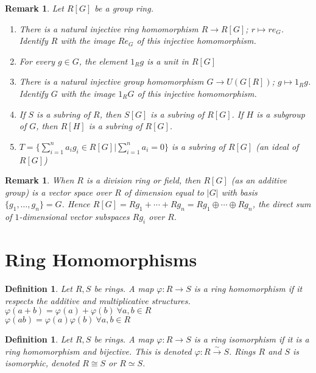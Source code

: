 \documentclass[a4paper,sfsidenotes,openany]{tufte-book}
\theoremstyle{theorem}
\newtheorem{definition}[theorem]{Definition}
\newtheorem{remark}[theorem]{Remark}
\begin{document}
\begin{fullwidth}
\begin{remark}
Let $R[G]$ be a group ring.
\begin{enumerate}[label=(\roman*),leftmargin=0pt, itemindent=4em, align=left]
\item There is a natural injective ring homomorphism $R \rightarrow R[G]$; $r \mapsto r e_G$. Identify $R$ with the image $R e_G$ of this injective homomorphism.
\item For every $g \in G$, the element $1_R g$ is a unit in $R[G]$
\item There is a natural injective group homomorphism $G \rightarrow U(G[R])$; $g \mapsto 1_R g$. Identify $G$ with the image $1_R G$ of this injective homomorphism.
\item If $S$ is a subring of $R$, then $S[G]$ is a subring of $R[G]$. If $H$ is a subgroup of $G$, then $R[H]$ is a subring of $R[G]$.
\item $T = \{\sum_{i=1}^{n} a_i g_i \in R[G] | \sum_{i=1}^{n} a_i = 0\}$ is a subring of $R[G]$ (an ideal of $R[G]$)
\end{enumerate}
\end{remark}
\>

\begin{remark}
When $R$ is a division ring or field, then $R[G]$ (as an additive group) is a vector space over $R$ of dimension equal to $\left| G \right|$ with basis $\{g_1, \ldots, g_n\} = G$.
Hence $R[G] = Rg_1 + \cdots + Rg_n = Rg_1 \oplus \cdots \oplus Rg_n$, the direct sum of $1$-dimensional vector subspaces $Rg_i$ over $R$.\\
\end{remark}
\>

\section{Ring Homomorphisms}

\begin{definition}
Let $R, S$ be rings. A map $\varphi: R \rightarrow S$ is a \textit{{\color{blue} ring homomorphism}} if it respects the additive and multiplicative structures.\\
$\varphi(a+b) = \varphi(a) + \varphi(b) \ \forall a, b \in R$\\
$\varphi(ab) = \varphi(a)\varphi(b) \ \forall a, b \in R$\\
\end{definition}
\>

\begin{definition}
Let $R, S$ be rings. A map $\varphi: R \rightarrow S$ is a \textit{{\color{blue} ring isomorphism}} if it is a ring homomorphism and bijective.
This is denoted $\varphi: R \xrightarrow{\sim} S$. Rings $R$ and $S$ is \textit{{\color{blue} isomorphic}}, denoted $R \cong S$ or $R \simeq S$.
\end{definition}
\>


\end{fullwidth}
\end{document}
